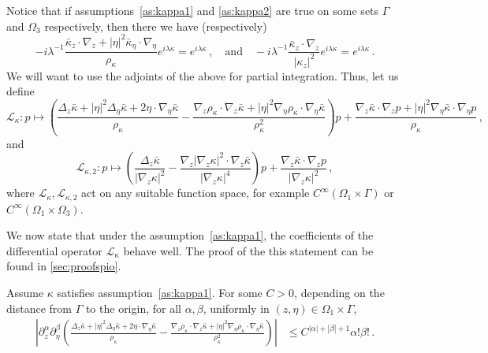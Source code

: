 \documentclass[
	fontsize=11pt, 
	twoside=false, 
	abstract=true, 
	a4paper,
]{scrartcl}
\newcommand{\abs}[1]{\left\lvert#1\right\rvert}
\newcommand{\del}{\partial}
\newcommand{\an}{\quad\text{and}\quad}
\begin{document}
Notice that if assumptions~\ref{as:kappa1} and \ref{as:kappa2} are true on some sets $\Gamma$ and $\Omega_3$ respectively, then there we have (respectively)%
\[
	-i\lambda^{-1} \frac{\bar\kappa_z \cdot \nabla_z+\abs{\eta}^2\bar\kappa_\eta \cdot\nabla_\eta}{\rho_\kappa}e^{i\lambda\kappa} = e^{i\lambda\kappa}\,,\an -i\lambda^{-1} \frac{\bar\kappa_z \cdot \nabla_z}{\abs{\kappa_z}^2} e^{i\lambda\kappa} = e^{i\lambda\kappa}\,.
\]
We will want to use the adjoints of the above for partial integration. Thus, let us define 
{\small
\begin{equation}\label{eq:defofL}
	\mathcal{L}_{\kappa} \colon p \mapsto\left(\frac{\Delta_z\bar\kappa+\abs{\eta}^2\Delta_\eta\bar\kappa+2\eta\cdot\nabla_\eta\bar\kappa}{\rho_\kappa} - \frac{\nabla_z\rho_\kappa \cdot \nabla_z\bar\kappa + \abs{\eta}^2\nabla_\eta\rho_\kappa \cdot\nabla_\eta\bar\kappa}{\rho_\kappa^2}\right)p+\frac{\nabla_z\bar\kappa \cdot \nabla_z p + \abs{\eta}^2\nabla_\eta\bar\kappa \cdot \nabla_\eta p}{\rho_\kappa}\,,
\end{equation}}
and
\begin{equation}\label{eq:defofLz}
	\mathcal{L}_{\kappa, 2} \colon p \mapsto\left(\frac{\Delta_z\bar\kappa}{\abs{\nabla_z \kappa}^2} - \frac{\nabla_z\abs{\nabla_z \kappa}^2 \cdot \nabla_z\bar\kappa}{\abs{\nabla_z \kappa}^4}\right)p+\frac{\nabla_z \bar\kappa \cdot \nabla_z p}{\abs{\nabla_z \kappa}^2}\,,
\end{equation}
where $\mathcal{L}_\kappa,\mathcal{L}_{\kappa,2}$ act on any suitable function space, for example $C^\infty(\Omega_1\times\Gamma)$ or $C^\infty(\Omega_1\times\Omega_3)$.

We now state that under the assumption~\ref{as:kappa1}, the coefficients of the differential operator $\mathcal{L}_\kappa$ behave well. The proof of the this statement can be found in \cref{sec:proofspio}. 

\begin{lemma}\label{cor:Lphifitskappa1}
	Assume $\kappa$ satisfies assumption~\ref{as:kappa1}. For some $C>0$, depending on the distance from $\Gamma$ to the origin, for all $\alpha,\beta$, uniformly in $(z,\eta)\in \Omega_1\times\Gamma$,
	\begin{align}%
		\abs{\del^{\alpha}_z\del^{\beta}_\eta\left(\frac{\Delta_z\bar\kappa+\abs{\eta}^2\Delta_\eta\bar\kappa+2\eta\cdot\nabla_\eta\bar\kappa}{\rho_\kappa} - \frac{\nabla_z\rho_\kappa \cdot \nabla_z\bar\kappa + \abs{\eta}^2\nabla_\eta\rho_\kappa \cdot\nabla_\eta\bar\kappa}{\rho_\kappa^2}\right)} &\leq C^{\abs{\alpha}+\abs{\beta}+1}\alpha!\beta!\,.\label{eq:phifitskappaside}
	\end{align}
\end{lemma}
\end{document}
